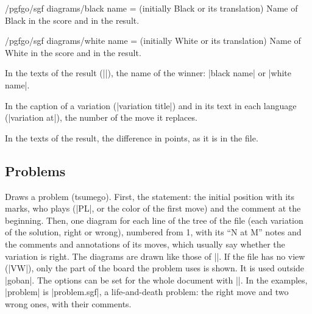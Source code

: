 \begin{key}{/pgfgo/sgf diagrams/black name =  (initially Black or its translation)}
	Name of Black in the score and in the result.
\end{key}

\begin{key}{/pgfgo/sgf diagrams/white name =  (initially White or its translation)}
	Name of White in the score and in the result.

	\begin{codeexample}
	\end{codeexample}

\end{key}

\begin{command}{\pgfgowinner}
	In the texts of the result (|\pgfgodefinelanguage|), the name of the winner: |black name| or |white name|.
\end{command}

\begin{command}{\pgfgovariationmove}
	In the caption of a variation (|variation title|) and in its text in each language (|variation at|), the number of the move it replaces.
\end{command}

\begin{command}{\pgfgopoints}
	In the texts of the result, the difference in points, as it is in the file.
\end{command}

\subsection{Problems}
\label{subsec:sgfproblemas}

\begin{command}{\sgfproblem{}}
	Draws a problem (tsumego). First, the statement: the initial position with its marks, who plays (|PL|, or the color of the first move) and the comment at the beginning. Then, one diagram for each line of the tree of the file (each variation of the solution, right or wrong), numbered from 1, with its ``N at M'' notes and the comments and annotations of its moves, which usually say whether the variation is right. The diagrams are drawn like those of |\sgfdiagrams|. If the file has no view (|VW|), only the part of the board the problem uses is shown. It is used outside |goban|. The options can be set for the whole document with ||. In the examples, |problem| is |problem.sgf|, a life-and-death problem: the right move and two wrong ones, with their comments.

	\begin{codeexample}
	\end{codeexample}
\end{command}

